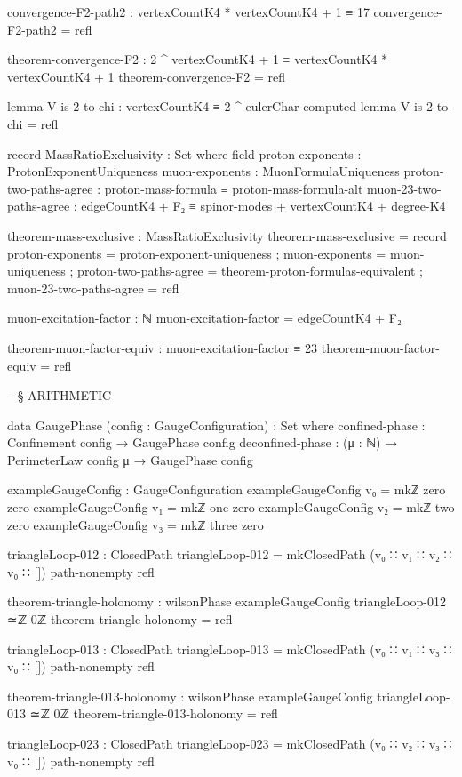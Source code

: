 \documentclass[11pt,a4paper]{book}
\begin{document}
\begin{code}
convergence-F2-path2 : vertexCountK4 * vertexCountK4 + 1 ≡ 17
convergence-F2-path2 = refl

theorem-convergence-F2 : 2 ^ vertexCountK4 + 1 ≡ vertexCountK4 * vertexCountK4 + 1
theorem-convergence-F2 = refl

lemma-V-is-2-to-chi : vertexCountK4 ≡ 2 ^ eulerChar-computed
lemma-V-is-2-to-chi = refl

record MassRatioExclusivity : Set where
  field
    proton-exponents        : ProtonExponentUniqueness
    muon-exponents          : MuonFormulaUniqueness
    proton-two-paths-agree  : proton-mass-formula ≡ proton-mass-formula-alt
    muon-23-two-paths-agree : edgeCountK4 + F₂ ≡ spinor-modes + vertexCountK4 + degree-K4

theorem-mass-exclusive : MassRatioExclusivity
theorem-mass-exclusive = record
  { proton-exponents = proton-exponent-uniqueness
  ; muon-exponents = muon-uniqueness
  ; proton-two-paths-agree = theorem-proton-formulas-equivalent
  ; muon-23-two-paths-agree = refl
  }

muon-excitation-factor : ℕ
muon-excitation-factor = edgeCountK4 + F₂

theorem-muon-factor-equiv : muon-excitation-factor ≡ 23
theorem-muon-factor-equiv = refl


-- § ARITHMETIC

data GaugePhase (config : GaugeConfiguration) : Set where
  confined-phase   : Confinement config → GaugePhase config
  deconfined-phase : (μ : ℕ) → PerimeterLaw config μ → GaugePhase config

exampleGaugeConfig : GaugeConfiguration
exampleGaugeConfig v₀ = mkℤ zero zero
exampleGaugeConfig v₁ = mkℤ one zero
exampleGaugeConfig v₂ = mkℤ two zero
exampleGaugeConfig v₃ = mkℤ three zero

triangleLoop-012 : ClosedPath
triangleLoop-012 = mkClosedPath 
  (v₀ ∷ v₁ ∷ v₂ ∷ v₀ ∷ [])
  path-nonempty
  refl

theorem-triangle-holonomy : wilsonPhase exampleGaugeConfig triangleLoop-012 ≃ℤ 0ℤ
theorem-triangle-holonomy = refl

triangleLoop-013 : ClosedPath
triangleLoop-013 = mkClosedPath 
  (v₀ ∷ v₁ ∷ v₃ ∷ v₀ ∷ [])
  path-nonempty
  refl

theorem-triangle-013-holonomy : wilsonPhase exampleGaugeConfig triangleLoop-013 ≃ℤ 0ℤ
theorem-triangle-013-holonomy = refl


triangleLoop-023 : ClosedPath
triangleLoop-023 = mkClosedPath 
  (v₀ ∷ v₂ ∷ v₃ ∷ v₀ ∷ [])
  path-nonempty
  refl


\end{code}
\end{document}
